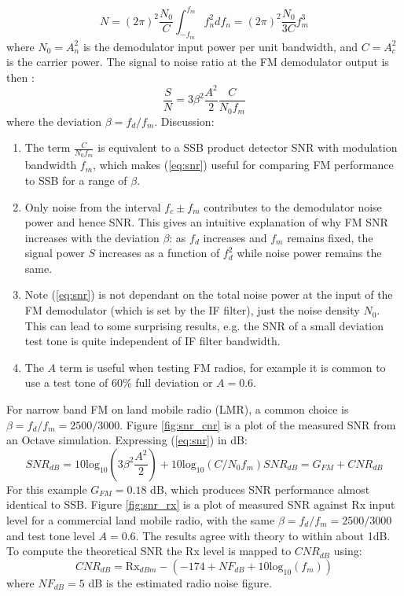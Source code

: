 \documentclass{article}
\begin{document}
\begin{equation}
N = (2\pi)^2 \frac{N_0}{C} \int_{-f_m}^{f_m} f_n^2 df_n = (2\pi)^2 \frac{N_0}{3C} f_m^3
\end{equation}
where $N_0=A_n^2$ is the demodulator input power per unit bandwidth, and $C=A_c^2$ is the carrier power.  The signal to noise ratio at the FM demodulator output is then \cite{crilly2009communication}:
\begin{equation}
\label{eq:snr}
\frac{S}{N} = 3 \beta^2 \frac{A^2}{2} \frac{C}{N_0 f_m}
\end{equation}
where the deviation $\beta=f_d/f_m$. Discussion:
\begin{enumerate}
\item The term $\frac{C}{N_0 f_m}$ is equivalent to a SSB product detector SNR with modulation bandwidth $f_m$, which makes (\ref{eq:snr}) useful for comparing FM performance to SSB for a range of $\beta$.
\item Only noise from the interval $f_c \pm f_m$ contributes to the demodulator noise power and hence SNR. This gives an intuitive explanation of why FM SNR increases with the deviation $\beta$: as $f_d$ increases and $f_m$ remains fixed, the signal power $S$ increases as a function of $f_d^2$ while noise power remains the same.
\item Note (\ref{eq:snr}) is not dependant on the total noise power at the input of the FM demodulator (which is set by the IF filter), just the noise density $N_0$.  This can lead to some surprising results, e.g. the SNR of a small deviation test tone is quite independent of IF filter bandwidth.
\item The $A$ term is useful when testing FM radios, for example it is common to use a test tone of 60\% full deviation or $A=0.6$.
\end{enumerate}

For narrow band FM on land mobile radio (LMR), a common choice is $\beta=f_d/f_m=2500/3000$.  Figure \ref{fig:snr_cnr} is a plot of the measured SNR from an Octave simulation. Expressing (\ref{eq:snr}) in dB:
\begin{equation}
SNR_{dB} = 10\mathrm{log_{10}}\left( 3 \beta^2 \frac{A^2}{2} \right) + 10\mathrm{log_{10}}(C/N_0f_m)
SNR_{dB} = G_{FM} + CNR_{dB}
\end{equation}
For this example $G_{FM}=0.18$ dB, which produces SNR performance almost identical to SSB. Figure \ref{fig:snr_rx} is a plot of measured SNR against Rx input level for a commercial land mobile radio, with the same $\beta=f_d/f_m=2500/3000$ and test tone level $A=0.6$.  The results agree with theory to within about 1dB. To compute the theoretical SNR the Rx level is mapped to $CNR_{dB}$ using:
\begin{equation}
CNR_{dB} = \mathrm{Rx}_{dBm} - (-174 + NF_{dB} + 10\mathrm{log_{10}}(f_m)) 
\end{equation}
where $NF_{dB}=5$ dB is the estimated radio noise figure.
\end{document}
